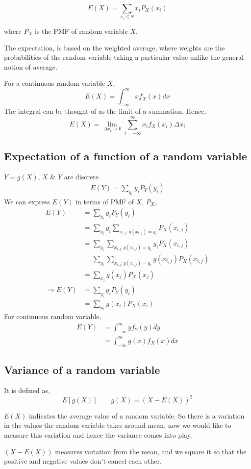 \documentclass{article}
\begin{document}
$$ E(X)= \sum_{x_i \in S}x_i P_X(x_i)$$

where $P_X$ is the PMF of random variable $X$.

The expectation, is based on the weighted average, where weights are the probabilities of the random variable taking a particular value unlike the general notion of average.

For a continuous random variable $X$,
$$ E(X)= \int_{-\infty}^{\infty}x f_X(x)dx$$
The integral can be thought of as the limit of a summation. Hence,
$$ E(X)= \lim_{\Delta x_i \to 0} \sum_{i= -\infty}^{\infty}x_i f_X(x_i) \Delta x_i$$

\subsection{Expectation of a function of a random variable}

$ Y= g(X)$, $X$ \& $Y$ are discrete.
\begin{align*}
    E(Y)= \sum_{y_i}y_i P_Y(y_i)
\end{align*}
We can express $E(Y)$ in terms of PMF of $X$, $P_X$,
\begin{align*}
    E(Y)&= \sum_{y_i}y_i P_Y(y_i) \\
    &= \sum_{y_i}y_i \sum_{x_{i,j}:g(x_{i,j})= y_i} P_X(x_{i,j}) \\
    &= \sum_{y_i} \sum_{x_{i,j}:g(x_{i,j})= y_i} y_i P_X(x_{i,j}) \\
    &= \sum_{y_i} \sum_{x_{i,j}:g(x_{i,j})= y_i} g(x_{i,j}) P_X(x_{i,j}) \\
    &= \sum_{x_j} g(x_j) P_X(x_j)\\
    \Rightarrow E(Y) &= \sum_{y_i}y_i P_Y(y_i) \\
    &= \sum_{x_i} g(x_i) P_X(x_i)
\end{align*}
For continuous random variable,
\begin{align*}
    E(Y) &= \int_{-\infty}^{\infty}y f_Y(y)dy \\
    &= \int_{-\infty}^{\infty} g(x)f_X(x)dx
\end{align*}

\subsection{Variance of a random variable}
It is defined as,
$$ E[g(X)] \qquad g(X)= (X - E(X))^2$$

$E(X)$ indicates the average value of a random variable. So there is a variation in the values the random variable takes around mean, now we would like to measure this variation and hence the variance comes into play.

$(X- E(X))$ measures variation from the mean, and we square it so that the positive and negative values don't cancel each other.
\end{document}
